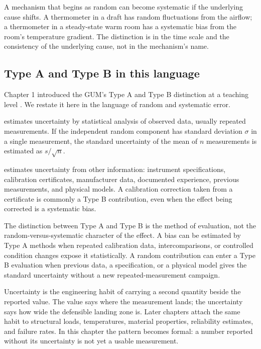 A mechanism that begins as random can become systematic if the
underlying cause shifts. A thermometer in a draft has random
fluctuations from the airflow; a thermometer in a steady-state warm
room has a systematic bias from the room's temperature gradient.
The distinction is in the time scale and the consistency of the
underlying cause, not in the mechanism's name.

\subsection{Type A and Type B in this language}

Chapter 1 introduced the GUM's Type A and Type B distinction at a
teaching level \cite{std:iso-iec-guide98}. We restate it here in
the language of random and systematic error.

 estimates uncertainty by statistical
analysis of observed data, usually repeated measurements. If the
independent random component has standard deviation $\sigma$ in a
single measurement, the standard uncertainty of the mean of $n$
measurements is estimated as $s/\sqrt{n}$.

 estimates uncertainty from other
information: instrument specifications, calibration certificates,
manufacturer data, documented experience, previous measurements, and
physical models. A calibration correction taken from a certificate
is commonly a Type B contribution, even when the effect being
corrected is a systematic bias.

The distinction between Type A and Type B is the method of
evaluation, not the random-versus-systematic character of the
effect. A bias can be estimated by Type A methods when repeated
calibration data, intercomparisons, or controlled condition changes
expose it statistically. A random contribution can enter a Type B
evaluation when previous data, a specification, or a physical model
gives the standard uncertainty without a new repeated-measurement
campaign.

\begin{archetype}
Uncertainty is the engineering habit of carrying a second quantity
beside the reported value. The value says where the measurement
lands; the uncertainty says how wide the defensible landing zone is.
Later chapters attach the same habit to structural loads,
temperatures, material properties, reliability estimates, and
failure rates. In this chapter the pattern becomes formal: a number
reported without its uncertainty is not yet a usable measurement.
\end{archetype}


